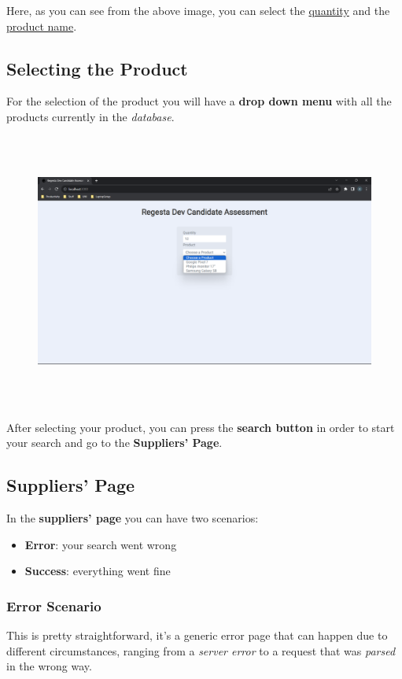 \documentclass[11pt]{article}
\begin{document}
  Here, as you can see from the above image, you can select the \underline{quantity} and the \underline{product name}.
  
  \subsection*{Selecting the Product}
  For the selection of the product you will have a \textbf{drop down menu} with all the products currently in the \textit{database}.

  \begin{figure}[h]
    \centering
    \includegraphics[height=9.0593cm]{images/02.png}
  \end{figure}

  After selecting your product, you can press the \textbf{search button} in order to start your search and go to the \textbf{Suppliers' Page}.

  \subsection*{Suppliers' Page}
  In the \textbf{suppliers' page} you can have two scenarios:
  \begin{itemize}
    \item \textbf{Error}: your search went wrong
    \item \textbf{Success}: everything went fine
  \end{itemize}

  \subsubsection*{Error Scenario}
  This is pretty straightforward, it's a generic error page that can happen due to different circumstances, ranging from a \textit{server error} to a request that was \textit{parsed} in the wrong way.
\end{document}
